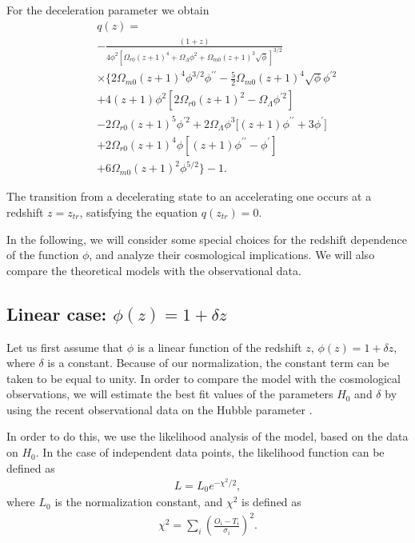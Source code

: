 \documentclass[aps,superscriptaddress, showpacs,preprintnumbers, superscriptaddress, nofootinbibt,twocolumn]{revtex4-2}
\begin{document}
For the deceleration parameter we obtain
\begin{eqnarray}
&&q(z)=  \nonumber \\
&&-\frac{(1+z)}{4\phi ^{2}\left[ \Omega _{r0}(z+1)^{4}+\Omega _{\Lambda
}\phi ^{2}+\Omega _{m0}(z+1)^{3}\sqrt{\phi }\right] ^{3/2}}  \nonumber \\
&&\times \Bigg\{2\Omega _{m0}(z+1)^{4}\phi ^{3/2}\phi ^{\prime \prime }-%
\frac{5}{2}\Omega _{m0}(z+1)^{4}\sqrt{\phi }\phi ^{\prime 2}  \nonumber \\
&&+4(z+1)\phi ^{2}\left[ 2\Omega _{r0}(z+1)^{2}-\Omega _{\Lambda }\phi
^{\prime 2}\right]   \nonumber \\
&&-2\Omega _{r0}(z+1)^{5}\phi ^{\prime 2}+2\Omega _{\Lambda }\phi ^{3}\Big[%
(z+1)\phi ^{\prime \prime }+3\phi ^{\prime }\Big]  \nonumber \\
&&+2\Omega _{r0}(z+1)^{4}\phi \left[ (z+1)\phi ^{\prime \prime }-\phi
^{\prime }\right]   \nonumber \\
&&+6\Omega _{m0}(z+1)^{2}\phi ^{5/2}\Bigg\}-1.
\end{eqnarray}

The transition from a decelerating state to an accelerating one occurs at a redshift $z=z_{tr}$, satisfying the equation $q\left(z_{tr}\right)=0$.

In the following, we will consider some special choices for the redshift dependence of the function $\phi$, and analyze their cosmological implications. We will also compare the theoretical models with the observational data.

\subsection{Linear case: $\phi(z)=1+\delta z$}

Let us first assume that $\phi$ is a linear function of the redshift $z$, $\phi (z)=1+\delta z$, where $\delta $ is a constant. Because of our normalization, the constant term can be taken to be equal to unity. In order to compare the model with the cosmological observations, we will estimate the best fit values of the parameters $H_0$ and $\delta $ by using the recent observational data on the Hubble parameter \cite{hubble1, hubble2}.

In order to do this, we use the likelihood analysis of the model, based on the data on $H_0$. In the case of independent data points, the likelihood function can be defined as
\begin{align}
L=L_0e^{-\chi^2/2},
\end{align}
where $L_0$ is the normalization constant, and $\chi^2$ is defined as
\begin{align}
\chi^2=\sum_i\left(\frac{O_i-T_i}{\sigma_i}\right)^2.
\end{align}
\end{document}
